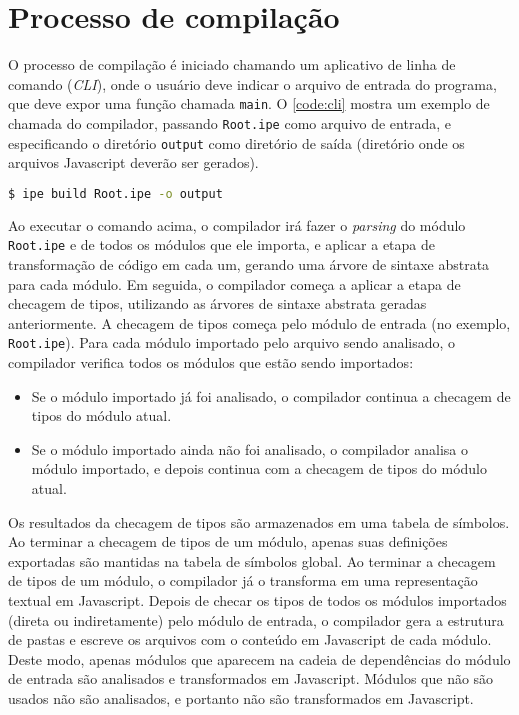 \section{Processo de compilação}\label{sec:processo_de_compilacao}

O processo de compilação é iniciado chamando um aplicativo de linha de comando (\textit{CLI}), onde
o usuário deve indicar o arquivo de entrada do programa, que deve expor uma função chamada
\texttt{main}. O \autoref{code:cli} mostra  um exemplo de chamada do compilador, passando
\texttt{Root.ipe} como arquivo de entrada, e especificando o diretório \texttt{output} como diretório
de saída (diretório onde os arquivos Javascript deverão ser gerados).

\begin{lstlisting}[language=Bash,label={code:cli},caption={Chamada do aplicativo de linha de comando}]
$ ipe build Root.ipe -o output
\end{lstlisting}

Ao executar o comando acima, o compilador irá fazer o \textit{parsing} do módulo \texttt{Root.ipe} e
de todos os módulos que ele importa, e aplicar a etapa de transformação de código em cada um, gerando
uma árvore de sintaxe abstrata para cada módulo. Em seguida, o compilador começa a aplicar a etapa
de checagem de tipos, utilizando as árvores de sintaxe abstrata geradas anteriormente. A checagem de
tipos começa pelo módulo de entrada (no exemplo, \texttt{Root.ipe}). Para cada módulo importado pelo
arquivo sendo analisado, o compilador verifica todos os módulos que estão sendo importados:

\begin{itemize}
      \item Se o módulo importado já foi analisado, o compilador continua a checagem de tipos do módulo
            atual.
      \item Se o módulo importado ainda não foi analisado, o compilador analisa o módulo importado, e
            depois continua com a checagem de tipos do módulo atual.
\end{itemize}

Os resultados da checagem de tipos são armazenados em uma tabela de símbolos. Ao terminar a checagem
de tipos de um módulo, apenas suas definições exportadas são mantidas na tabela de símbolos global.
Ao terminar a checagem de tipos de um módulo, o compilador já o transforma em uma representação textual
em Javascript. Depois de checar os tipos de todos os módulos importados (direta ou indiretamente)
pelo módulo de entrada, o compilador gera a estrutura de pastas e escreve os arquivos com o conteúdo
em Javascript de cada módulo. Deste modo, apenas módulos que aparecem na cadeia de dependências do
módulo de entrada são analisados e transformados em Javascript. Módulos que não são usados não são
analisados, e portanto não são transformados em Javascript.

